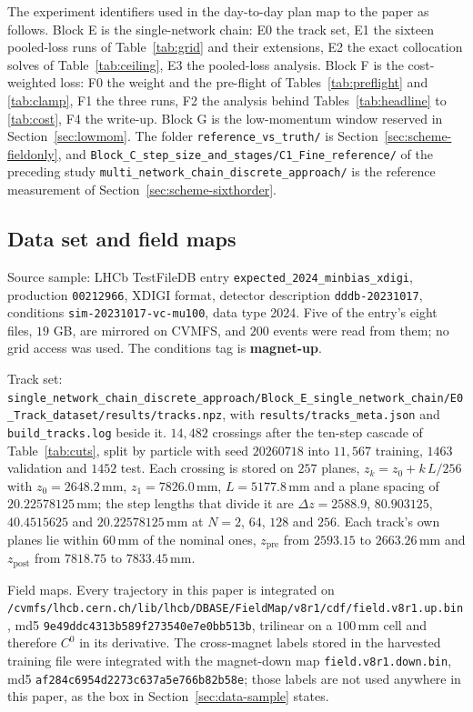 \documentclass[11pt,a4paper]{article}
\newcommand{\mm}{\ensuremath{\,\mathrm{mm}}}
\begin{document}
The experiment identifiers used in the day-to-day plan map to the paper as
follows. Block E is the single-network chain: E0 the track set, E1 the sixteen
pooled-loss runs of Table~\ref{tab:grid} and their extensions, E2 the exact
collocation solves of Table~\ref{tab:ceiling}, E3 the pooled-loss analysis.
Block F is the cost-weighted loss: F0 the weight and the pre-flight of
Tables~\ref{tab:preflight} and \ref{tab:clamp}, F1 the three runs, F2 the
analysis behind Tables~\ref{tab:headline} to \ref{tab:cost}, F4 the write-up.
Block G is the low-momentum window reserved in Section~\ref{sec:lowmom}. The
folder \texttt{reference\_vs\_truth/} is Section~\ref{sec:scheme-fieldonly}, and
\texttt{Block\_C\_step\_size\_and\_stages/C1\_Fine\_reference/} of the preceding
study \texttt{multi\_network\_chain\_discrete\_approach/} is the reference
measurement of Section~\ref{sec:scheme-sixthorder}.

\subsection*{Data set and field maps}

Source sample: LHCb TestFileDB entry \texttt{expected\_2024\_minbias\_xdigi},
production \texttt{00212966}, XDIGI format, detector description
\texttt{dddb-20231017}, conditions \texttt{sim-20231017-vc-mu100}, data type
2024. Five of the entry's eight files, $19$ GB, are mirrored on CVMFS, and
$200$ events were read from them; no grid access was used. The conditions tag
is \textbf{magnet-up}.

Track set:
\texttt{single\_network\_chain\_discrete\_approach/}\allowbreak\texttt{Block\_E\_single\_network\_chain/}\allowbreak\texttt{E0\_Track\_dataset/}\allowbreak\texttt{results/tracks.npz},
with \texttt{results/tracks\_meta.json} and \texttt{build\_tracks.log} beside
it. $14{,}482$ crossings after the ten-step cascade of Table~\ref{tab:cuts},
split by particle with seed $20260718$ into $11{,}567$ training, $1463$
validation and $1452$ test. Each crossing is stored on $257$ planes,
$z_k = z_0 + k\,L/256$ with $z_0 = 2648.2\mm$, $z_1 = 7826.0\mm$,
$L = 5177.8\mm$ and a plane spacing of $20.22578125\mm$; the step lengths that
divide it are $\Delta z = 2588.9$, $80.903125$, $40.4515625$ and
$20.22578125\mm$ at $N = 2$, $64$, $128$ and $256$. Each track's own planes lie
within $60\mm$ of the nominal ones, $z_{\mathrm{pre}}$ from $2593.15$ to
$2663.26\mm$ and $z_{\mathrm{post}}$ from $7818.75$ to $7833.45\mm$.

Field maps. Every trajectory in this paper is integrated on
\texttt{/cvmfs/lhcb.cern.ch/lib/lhcb/}\allowbreak\texttt{DBASE/FieldMap/v8r1/cdf/}\allowbreak\texttt{field.v8r1.up.bin},
md5 \texttt{9e49ddc4313b589f273540e7e0bb513b}, trilinear on a $100\mm$ cell and
therefore $C^0$ in its derivative. The cross-magnet labels stored in the
harvested training file were integrated with the magnet-down map
\texttt{field.v8r1.down.bin}, md5 \texttt{af284c6954d2273c637a5e766b82b58e};
those labels are not used anywhere in this paper, as the box in
Section~\ref{sec:data-sample} states.
\end{document}
